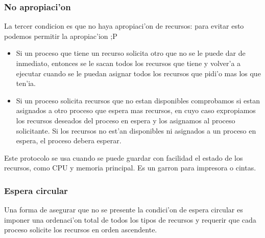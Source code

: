 \documentclass[a4paper,10pt]{article}
\begin{document}
\subsubsection{No apropiaci'on}
La tercer condicion es que no haya apropiaci'on de recursos: para evitar esto podemos permitir la apropiac'ion ;P
\begin{itemize}
 \item Si un proceso que tiene un recurso solicita otro que no se le puede dar de inmediato, entonces se le sacan todos los recursos que tiene y volver'a a ejecutar cuando se le puedan asignar todos los recursos que pidi'o mas los que ten'ia.
 \item Si un proceso solicita recursos que no estan disponibles comprobamos si estan asignados a otro proceso que espera mas recursos, en cuyo caso expropiamos los recursos deseados del proceso en espera y los asignamos al proceso solicitante. Si los recursos no est'an disponibles ni asignados a un proceso en espera, el proceso debera esperar.
\end{itemize}
Este protocolo se usa cuando se puede guardar con facilidad el estado de los recursos, como CPU y memoria principal. Es un garron para impresora o cintas.

\subsubsection{Espera circular}
Una forma de asegurar que no se presente la condici'on de espera circular es imponer una ordenaci'on total de todos los tipos de recursos y requerir que cada proceso solicite los recursos en orden ascendente.
\end{document}
